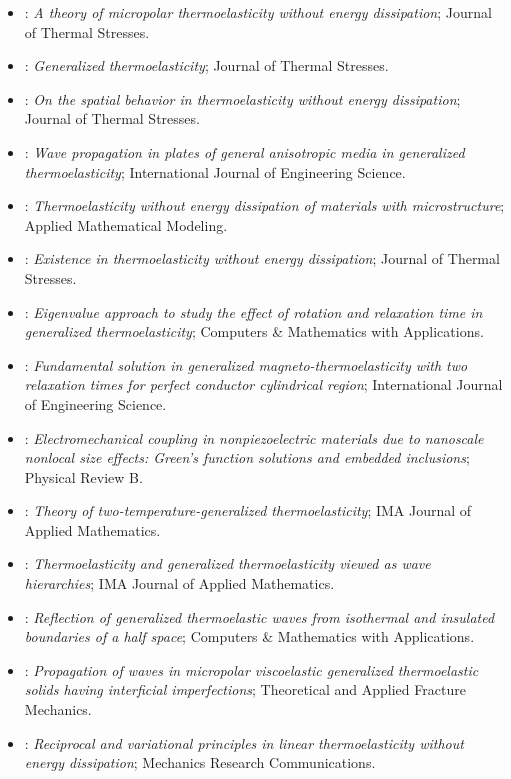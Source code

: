 \begin{itemize}
\item \citet{Ciarletta1999}: \emph{A theory of micropolar thermoelasticity without energy dissipation}; Journal of Thermal Stresses.
\item \citet{HetnarskiIgnaczak1999}: \emph{Generalized thermoelasticity}; Journal of Thermal Stresses.
\item \citet{Quintanilla1999}: \emph{On the spatial behavior in thermoelasticity without energy dissipation}; Journal of Thermal Stresses.
\item \citet{Verma2001}: \emph{Wave propagation in plates of general anisotropic media in generalized thermoelasticity}; International Journal of Engineering Science.
\item \citet{Quintanilla2002}: \emph{Thermoelasticity without energy dissipation of materials with microstructure}; Applied Mathematical Modeling.
\item \citet{Quintanilla2002a}: \emph{Existence in thermoelasticity without energy dissipation}; Journal of Thermal Stresses.
\item \citet{Sinha2003}: \emph{Eigenvalue approach to study the effect of rotation and relaxation time in generalized thermoelasticity}; Computers \& Mathematics with Applications.
\item \citet{Ezzat2004}: \emph{Fundamental solution in generalized magneto-thermoelasticity with two relaxation times for perfect conductor cylindrical region}; International Journal of Engineering Science.
\item \citet{Maranganti2006}: \emph{Electromechanical coupling in nonpiezoelectric materials due to nanoscale nonlocal size effects: Green's function solutions and embedded inclusions}; Physical Review B.
\item \citet{Youssef2006}: \emph{Theory of two-temperature-generalized thermoelasticity}; IMA Journal of Applied Mathematics.
\item \citet{Scott2007}: \emph{Thermoelasticity and generalized thermoelasticity viewed as wave hierarchies}; IMA Journal of Applied Mathematics.
\item \citet{Das2008}: \emph{Reflection of generalized thermoelastic waves from isothermal and insulated boundaries of a half space}; Computers \& Mathematics with Applications.
\item \citet{Kumar2008}: \emph{Propagation of waves in micropolar viscoelastic generalized thermoelastic solids having interficial imperfections}; Theoretical and Applied Fracture Mechanics.
\item \citet{Chirita2010}: \emph{Reciprocal and variational principles in linear thermoelasticity without energy dissipation}; Mechanics Research Communications.

\end{itemize}
